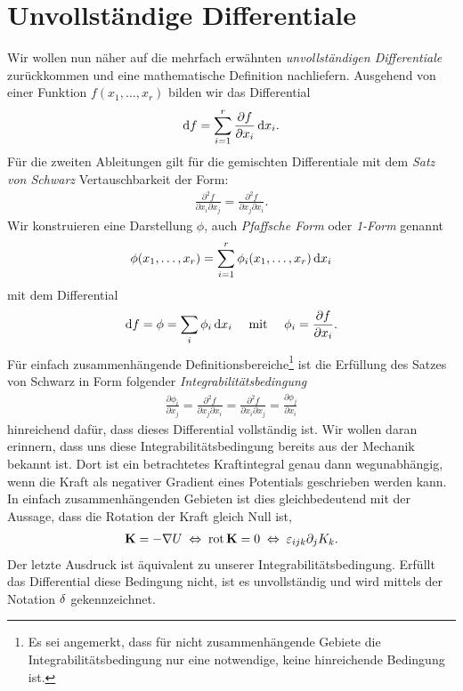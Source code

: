 \section{Unvollständige Differentiale}

Wir wollen nun näher auf die mehrfach erwähnten \emph{unvollständigen Differentiale} zurückkommen und eine mathematische Definition nachliefern. Ausgehend von einer Funktion $f(x_1,\ldots,x_r)$ bilden wir das Differential
\begin{align*}
    \mathop{}\!\mathrm{d} f = \sum_{i=1}^r \frac{\partial f}{\partial x_i} \mathop{}\!\mathrm{d} x_i.
\end{align*}
Für die zweiten Ableitungen gilt für die gemischten Differentiale mit dem \emph{Satz von Schwarz} Vertauschbarkeit der Form:
\begin{align*}
    \frac{\partial ^2 f}{\partial x_i \partial x_j} = \frac{\partial ^2 f}{\partial x_j \partial x_i}.
\end{align*}
Wir konstruieren eine Darstellung $\phi$, auch \emph{Pfaffsche Form} oder \emph{1-Form} genannt
\begin{align*}
    \phi (x_1,\ldots,x_r)=\sum _{i=1}^r \phi_i(x_1,\ldots,x_r)\mathop{}\!\mathrm{d} x_i
\end{align*}
mit dem Differential
\begin{align*}
    \mathop{}\!\mathrm{d} f = \phi = \sum_i \phi_i \mathop{}\!\mathrm{d} x_i \quad\text{ mit }\quad \phi_i = \frac{\partial f}{\partial x_i}.
\end{align*}
Für einfach zusammenhängende Definitionsbereiche\footnote{Es sei angemerkt, dass für nicht zusammenhängende Gebiete die Integrabilitätsbedingung nur eine notwendige, keine hinreichende Bedingung ist.} ist die Erfüllung des Satzes von Schwarz in Form folgender \emph{Integrabilitätsbedingung}
\begin{align*}
    \frac{\partial \phi_i}{\partial x_j}=\frac{\partial^2f}{\partial x_j\partial x_i}=\frac{\partial^2f}{\partial x_i\partial x_j}=\frac{\partial \phi_j}{\partial x_i}
\end{align*}
hinreichend dafür, dass dieses Differential vollständig ist.
Wir wollen daran erinnern, dass uns diese Integrabilitätsbedingung bereits aus der Mechanik bekannt ist. Dort ist ein betrachtetes Kraftintegral genau dann wegunabhängig, wenn die Kraft als negativer Gradient eines Potentials geschrieben werden kann. In einfach zusammenhängenden Gebieten ist dies gleichbedeutend mit der Aussage, dass die Rotation der Kraft gleich Null ist,
\begin{align*}
    \mathbf{K}=-\nabla U \;\Leftrightarrow\; \operatorname{rot}\mathbf{K}=0 \;\Leftrightarrow\; \varepsilon_{ijk}\partial_jK_k.
\end{align*}
Der letzte Ausdruck ist äquivalent zu unserer Integrabilitätsbedingung.
Erfüllt das Differential diese Bedingung nicht, ist es unvollständig und wird mittels der Notation $\mathop{}\!\delta$ gekennzeichnet.

